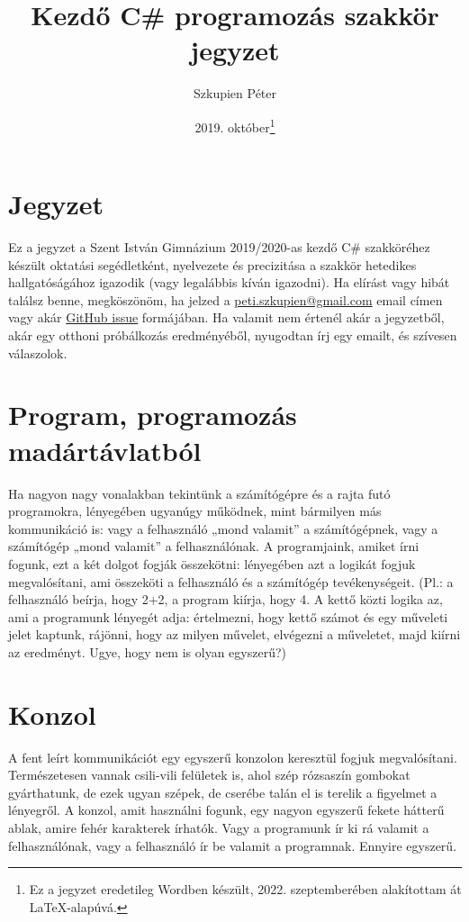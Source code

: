 \documentclass[a4paper]{article}
\title{Kezdő C\# programozás szakkör jegyzet}
\author{Szkupien Péter}
\date{2019. október\footnote{Ez a jegyzet eredetileg Wordben készült, 2022. szeptemberében alakítottam át \LaTeX-alapúvá.}}
\begin{document}
\maketitle

\section{Jegyzet}
Ez a jegyzet a Szent István Gimnázium 2019/2020-as kezdő C\# szakköréhez készült oktatási segédletként, nyelvezete és precizitása a szakkör hetedikes hallgatóságához igazodik (vagy legalábbis kíván igazodni). Ha elírást vagy hibát találsz benne, megköszönöm, ha jelzed a \href{mailto:peti.szkupien@gmail.com}{peti.szkupien@gmail.com} email címen vagy akár \href{https://github.com/szkupienpeti/csharp-lecture-notes/issues}{GitHub issue} formájában. Ha valamit nem értenél akár a jegyzetből, akár egy otthoni próbálkozás eredményéből, nyugodtan írj egy emailt, és szívesen válaszolok.

\section{Program, programozás madártávlatból}
Ha nagyon nagy vonalakban tekintünk a számítógépre és a rajta futó programokra, lényegében ugyanúgy működnek, mint bármilyen más kommunikáció is: vagy a felhasználó „mond valamit” a számítógépnek, vagy a számítógép „mond valamit” a felhasználónak. A programjaink, amiket írni fogunk, ezt a két dolgot fogják összekötni: lényegében azt a logikát fogjuk megvalósítani, ami összeköti a felhasználó és a számítógép tevékenységeit. (Pl.: a felhasználó beírja, hogy 2+2, a program kiírja, hogy 4. A kettő közti logika az, ami a programunk lényegét adja: értelmezni, hogy kettő számot és egy műveleti jelet kaptunk, rájönni, hogy az milyen művelet, elvégezni a műveletet, majd kiírni az eredményt. Ugye, hogy nem is olyan egyszerű?)

\section{Konzol}
A fent leírt kommunikációt egy egyszerű konzolon keresztül fogjuk megvalósítani. Természetesen vannak csili-vili felületek is, ahol szép rózsaszín gombokat gyárthatunk, de ezek ugyan szépek, de cserébe talán el is terelik a figyelmet a lényegről. A konzol, amit használni fogunk, egy nagyon egyszerű fekete hátterű ablak, amire fehér karakterek írhatók. Vagy a programunk ír ki rá valamit a felhasználónak, vagy a felhasználó ír be valamit a programnak. Ennyire egyszerű.
\end{document}
